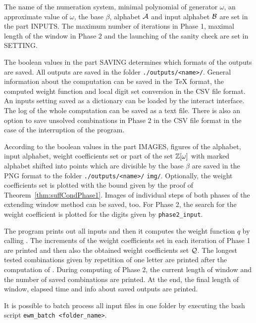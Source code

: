 \begin{upravit}
The name of the numeration system, minimal polynomial of generator $\omega$, an approximate value of $\omega$, the base $\beta$, alphabet $\mathcal{A}$ and input alphabet $\mathcal{B}$ are set in the part INPUTS. The maximum number of iterations in Phase 1, maximal length of the window in Phase 2 and the launching of the sanity check are set in SETTING. 

The boolean values in the part SAVING determines which formats of the outputs are saved. All outputs are saved in the folder \verb+./outputs/<name>/+. General information about the computation can be saved in the TeX format, the computed weight function and local digit set conversion in the CSV file format. An inputs setting saved as a dictionary can be loaded by the interact interface. The log of the whole computation can be saved as a text file. There is also an option to save unsolved combinations in Phase 2 in the CSV file format in the case of the interruption of the program.

According to the boolean values in the part IMAGES, figures of the alphabet, input alphabet, weight coefficients set or part of the set $\mathbb{Z}[\omega]$ with marked alphabet shifted into points which are divisible by the base $\beta$ are saved in the PNG format to the folder \verb+./outputs/<name>/+ \verb+img/+. Optionally, the weight coefficients set is plotted with the  bound given by the proof of Theorem~\ref{thm:suffCondPhase1}. Images of individual steps of both phases of the extending window method can be saved, too. For Phase 2, the search for the weight coefficient  is plotted for the digits given by \verb+phase2_input+.  

The program prints out all inputs and then it computes the weight function $q$ by calling . The increments of the weight coefficients set in each iteration of Phase 1 are printed and then also the obtained weight coefficients set $\mathcal{Q}$. The longest tested combinations given by repetition of one letter are printed after the computation of . During computing of Phase 2, the current length of window and the number of saved combinations are printed. At the end, the final length of window, elapsed time and info about saved outputs are printed.  

It is possible to batch process all input files in one folder by executing the bash script \verb+ewm_batch <folder_name>+.  


\end{upravit}
